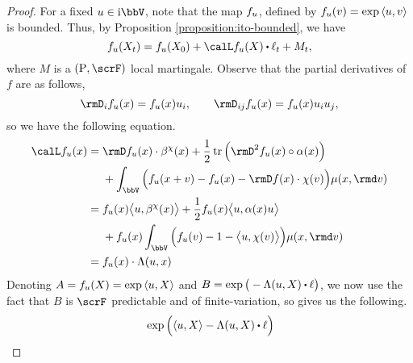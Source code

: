 \begin{proof}
  \label{proof:proposition:LK}
  For a fixed $\momentVar \in \im\vecSpace$, note that the map $f_u$, defined by $f_u(v) = \exp{\langle u, v\rangle}$ is bounded.
  Thus, by Proposition \ref{proposition:ito-bounded}, we have 
  \[
    f_\momentVar(\X_t) = f_\momentVar(\X_0) +  \generator f_\momentVar(\X) \shortInt \leb_t + M_t,
  \]
  where $M$ is a $(\Prb, \scrF)$ local martingale.
  Observe that the partial derivatives of $f$ are as follows,
  \begin{equation}
    \label{eq:exponential-derivatives}
    \Der_i f_\momentVar(\stateVar) = f_\momentVar(\stateVar) \momentVar_i, \qquad \Der_{ij} f_\momentVar(\stateVar) = f_\momentVar(\stateVar) \momentVar_i\momentVar_j,
  \end{equation}
  so we have the following equation.
  \begin{align*}
    \generator f_\momentVar(\stateVar)
    &=\begin{aligned}[t]
      &\Der f_\momentVar(\stateVar) \cdot \affDrift^\trunc(\stateVar) + \frac12 \tr\Big( \Hess f_\momentVar(\stateVar) \circ \affDiff(\stateVar) \Big) \\
      &+ \int_\vecSpace \Big( f_\momentVar(\stateVar + \markVar) - f_\momentVar(\stateVar) - \Der f(\stateVar) \cdot \trunc(\markVar) \Big) \affJump(\stateVar, \rmd\markVar)
    \end{aligned} \\
    &= \begin{aligned}[t]
      &f_\momentVar(\stateVar) \bprj{\momentVar}{\affDrift^\trunc(\stateVar)} 
      + \frac12 f_\momentVar(\stateVar) \bprj{\momentVar}{\affDiff(\stateVar)\momentVar} \\
      &+  f_\momentVar(\stateVar) \int_\vecSpace \Big( f_\momentVar(\markVar) - 1 - \bprj{\momentVar}{\trunc(\markVar)} \Big) \affJump(\stateVar, \rmd\markVar) 
    \end{aligned} \\
    &= f_\momentVar(\stateVar) \cdot \ode(\momentVar, \stateVar)
  \end{align*}
  Denoting $A = f_u(X) = \exp{\langle u, X\rangle}$ and $B = \exp\big(-\ode(\momentVar, \X) \shortInt \leb\big)$, we now use the fact that $B$ is $\scrF$ predictable and of finite-variation, so \cite[Proposition I.4.49(b)]{jacod2003} gives us the following.
  \begin{align*}
    &\exp\Big(\prj{\momentVar}{\X} - \ode(\momentVar, \X) \shortInt \leb \Big) \\

\end{align*}
\end{proof}
